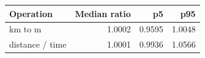\begin{tabular}{@{}lrrr@{}}
\toprule
Operation & Median ratio & p5 & p95 \\
\midrule
km to m & 1.0002 & 0.9595 & 1.0048 \\
distance / time & 1.0001 & 0.9936 & 1.0566 \\
\bottomrule
\end{tabular}
